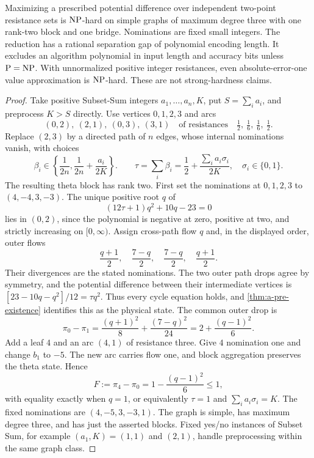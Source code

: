 \begin{theorem}
\label{thm:a-bound-pressure}
Maximizing a prescribed potential difference over independent two-point
resistance sets is $\mathrm{NP}$-hard on simple graphs of maximum degree three
with one rank-two block and one bridge. Nominations are fixed small
integers. The reduction has a rational separation gap of polynomial
encoding length. It excludes an algorithm polynomial in input length
and accuracy bits unless $\mathrm P=\mathrm{NP}$. With unnormalized positive
integer resistances, even absolute-error-one value approximation is
$\mathrm{NP}$-hard. These are not strong-hardness claims.
\end{theorem}
\begin{proof}
Take positive Subset-Sum integers $a_1,\ldots,a_n,K$, put $S=\sum_i a_i$,
and preprocess $K>S$ directly. Use vertices $0,1,2,3$ and arcs
\[
 (0,2),\ (2,1),\ (0,3),\ (3,1)
 \quad\text{of resistances}\quad
 \tfrac12,\ \tfrac16,\ \tfrac16,\ \tfrac12.
\]
Replace $(2,3)$ by a directed path of $n$ edges, whose internal
nominations vanish, with choices
\[
 \beta_i\in\left\{\frac1{2n},\frac1{2n}+\frac{a_i}{2K}\right\}.
 \qquad
 \tau=\sum_i\beta_i=\frac12+\frac{\sum_i a_i\sigma_i}{2K},
 \quad \sigma_i\in\{0,1\}.
\]
The resulting theta block has rank two. First set the nominations at
$0,1,2,3$ to $(4,-4,3,-3)$. The unique positive root $q$ of
\begin{equation}
 (12\tau+1)q^2+10q-23=0
 \label{eq:a-bound-theta}
\end{equation}
lies in $(0,2)$, since the polynomial is negative at zero, positive at
two, and strictly increasing on $[0,\infty)$. Assign cross-path flow $q$ and,
in the displayed order, outer flows
\[
 \frac{q+1}{2},\quad\frac{7-q}{2},\quad
 \frac{7-q}{2},\quad\frac{q+1}{2}.
\]
Their divergences are the stated nominations. The two outer path drops
agree by symmetry, and the potential difference between their
intermediate vertices is $[23-10q-q^2]/12=\tau q^2$. Thus every cycle
equation holds, and \cref{thm:a-pre-existence} identifies this as the
physical state.
The common outer drop is
\[
 \pi_0-\pi_1=\frac{(q+1)^2}{8}+\frac{(7-q)^2}{24}
             =2+\frac{(q-1)^2}{6}.
\]
Add a leaf $4$ and an arc $(4,1)$ of resistance three. Give $4$
nomination one and change $b_1$ to $-5$. The new arc carries flow one,
and block aggregation preserves the theta state. Hence
\begin{equation}
 F:=\pi_4-\pi_0=1-\frac{(q-1)^2}{6}\le1,
 \label{eq:a-bound-peak}
\end{equation}
with equality exactly when $q=1$, or equivalently $\tau=1$ and
$\sum_i a_i\sigma_i=K$. The fixed nominations are $(4,-5,3,-3,1)$.
The graph is simple, has maximum degree three, and has just the asserted
blocks. Fixed yes/no instances of Subset Sum, for example $(a_1,K)=(1,1)$
and $(2,1)$, handle preprocessing within the same graph class.


\end{proof}
